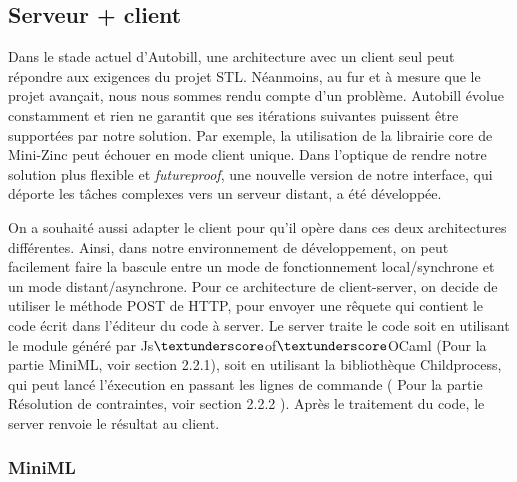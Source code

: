 \documentclass[12pt]{article}
\begin{document}
\hypertarget{serveur-client}{%
      \subsection{Serveur + client}\label{serveur-client}}

Dans le stade actuel d'Autobill, une architecture avec un client seul
peut répondre aux exigences du projet STL. Néanmoins, au fur et à mesure que le projet avançait, nous nous sommes rendu compte d'un problème. Autobill évolue constamment et rien ne garantit que ses itérations suivantes puissent
être supportées par notre solution. Par exemple, la utilisation de la librairie core de Mini-Zinc peut échouer en mode client unique. Dans l'optique de rendre notre solution plus flexible et \emph{futureproof}, une nouvelle version de notre interface, qui déporte les tâches complexes vers un serveur distant, a été développée.

On a souhaité aussi adapter le client pour qu'il opère dans ces deux
architectures différentes. Ainsi, dans notre environnement de
développement, on peut facilement faire la bascule entre un mode de
fonctionnement local/synchrone et un mode distant/asynchrone. Pour ce architecture de client-server, on decide de utiliser le méthode POST de HTTP, pour envoyer une rêquete qui contient le code écrit dans l'éditeur du code à server. Le server traite le code soit en utilisant le module généré par Js$\textunderscore$of$\textunderscore$OCaml (Pour la partie MiniML, voir section 2.2.1), soit en utilisant la bibliothèque Childprocess, qui peut lancé l'éxecution en passant les lignes de commande ( Pour la partie Résolution de contraintes, voir section 2.2.2 ). Après le traitement du code, le server renvoie le résultat au client.

\hypertarget{schema-de-communication-MINIML}{%
      \subsubsection{MiniML}\label{schema-de-communication-MINIML}}
\end{document}
